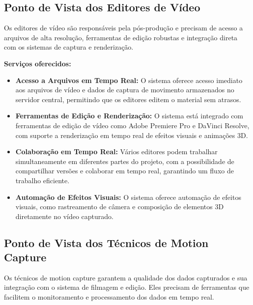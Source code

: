 \subsection{Ponto de Vista dos Editores de Vídeo}

Os editores de vídeo são responsáveis pela pós-produção e precisam de acesso a arquivos de alta resolução, ferramentas de edição robustas e integração direta com os sistemas de captura e renderização.

\textbf{Serviços oferecidos:}
\begin{itemize}
  \item \textbf{Acesso a Arquivos em Tempo Real:} O sistema oferece acesso imediato aos arquivos de vídeo e dados de captura de movimento armazenados no servidor central, permitindo que os editores editem o material sem atrasos.
  \item \textbf{Ferramentas de Edição e Renderização:} O sistema está integrado com ferramentas de edição de vídeo como Adobe Premiere Pro e DaVinci Resolve, com suporte a renderização em tempo real de efeitos visuais e animações 3D.
  \item \textbf{Colaboração em Tempo Real:} Vários editores podem trabalhar simultaneamente em diferentes partes do projeto, com a possibilidade de compartilhar versões e colaborar em tempo real, garantindo um fluxo de trabalho eficiente.
  \item \textbf{Automação de Efeitos Visuais:} O sistema oferece automação de efeitos visuais, como rastreamento de câmera e composição de elementos 3D diretamente no vídeo capturado.
\end{itemize}

\subsection{Ponto de Vista dos Técnicos de Motion Capture}

Os técnicos de motion capture garantem a qualidade dos dados capturados e sua integração com o sistema de filmagem e edição. Eles precisam de ferramentas que facilitem o monitoramento e processamento dos dados em tempo real.

